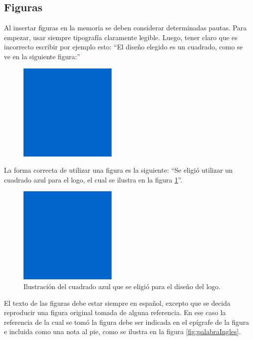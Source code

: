 \subsection{Figuras} 

Al insertar figuras en la memoria se deben considerar determinadas pautas. Para empezar, usar siempre tipografía claramente legible. Luego, tener claro que es incorrecto escribir por ejemplo esto: ``El diseño elegido es un cuadrado, como se ve en la siguiente figura:''

\begin{figure}[h]
\centering
\includegraphics[scale=.35]{./Figures/cuadradoAzul.png}
\end{figure}

La forma correcta de utilizar una figura es la siguiente: ``Se eligió utilizar un cuadrado azul para el logo, el cual se ilustra en la figura \ref{fig:cuadradoAzul}''.

\begin{figure}[h]
	\centering
	\includegraphics[scale=.35]{./Figures/cuadradoAzul.png}
	\caption{Ilustración del cuadrado azul que se eligió para el diseño del logo.}
	\label{fig:cuadradoAzul}
\end{figure}

El texto de las figuras debe estar siempre en español, excepto que se decida reproducir una figura original tomada de alguna referencia. En ese caso la referencia de la cual se tomó la figura debe ser indicada en el epígrafe de la figura e incluida como una nota al pie, como se ilustra en la figura \ref{fig:palabraIngles}.

